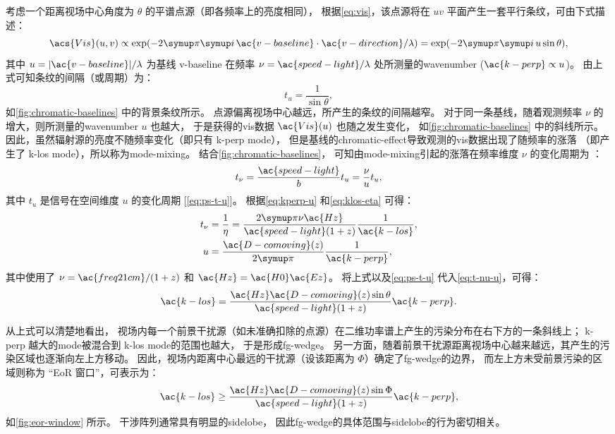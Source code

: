 考虑一个距离视场中心角度为 $\theta$ 的平谱点源（即各频率上的亮度相同），
根据\autoref{eq:vis}，该点源将在 $uv$ 平面产生一套平行条纹，可由下式描述：
\begin{equation}
  \acs{Vis}(u,v)
    \propto \exp (-2\Cpi\Ci\, \ac{v-baseline}\cdot\ac{v-direction} / \lambda)
    = \exp (-2\Cpi\Ci\, u \sin\theta) ,
\end{equation}
其中 $u = |\ac{v-baseline}|/\lambda$ 为基线 \ac{v-baseline}
在频率 $\nu = \ac{speed-light}/\lambda$ 处所测量的\ac{wavenumber}
($\ac{k-perp} \propto u$)。
由上式可知条纹的间隔（或周期）为：
\begin{equation}
  \label{eq:ps-t-u}
  t_u = \frac{1}{\sin\theta} ,
\end{equation}
如\autoref{fig:chromatic-baselines} 中的背景条纹所示。
点源偏离视场中心越远，所产生的条纹的间隔越窄。
对于同一条基线，随着观测频率 $\nu$ 的增大，则所测量的\ac{wavenumber} $u$ 也越大，
于是获得的\ac{vis}数据 $\ac{Vis}(u)$ 也随之发生变化，
如\autoref{fig:chromatic-baselines} 中的斜线所示。
因此，虽然辐射源的亮度不随频率变化（即只有 \ac{k-perp} \ac{mode}），
但是基线的\ac{chromatic-effect}导致观测的\ac{vis}数据出现了随频率的涨落
（即产生了 \ac{k-los} \ac{mode}），所以称为\ac{mode-mixing}。
结合\autoref{fig:chromatic-baselines}，
可知由\ac{mode-mixing}引起的涨落在频率维度 $\nu$ 的变化周期为 \cite{morales2012}：
\begin{equation}
  \label{eq:t-nu-u}
  t_{\nu} = \frac{\ac{speed-light}}{b} t_u
    = \frac{\nu}{u} t_u ,
\end{equation}
其中 $t_u$ 是信号在空间维度 $u$ 的变化周期 [\autoref{eq:ps-t-u}]。
根据\autoref{eq:kperp-u} 和\autoref{eq:klos-eta} 可得：
\begin{align}
  t_{\nu} & = \frac{1}{\eta}
    = \frac{2\Cpi \nu \ac{Hz}}{\ac{speed-light} (1+z)}
      \frac{1}{\ac{k-los}} , \\
  u & = \frac{\ac{D-comoving}(z)}{2\Cpi} \frac{1}{\ac{k-perp}} ,
\end{align}
其中使用了 $\nu = \ac{freq21cm} / (1+z)$ 和 $\ac{Hz} = \ac{H0} \ac{Ez}$。
将上式以及\autoref{eq:ps-t-u} 代入\autoref{eq:t-nu-u}，可得：
\begin{equation}
  \label{eq:klos-kperp}
  \ac{k-los} = \frac{\ac{Hz} \ac{D-comoving}(z) \sin\theta}{
    \ac{speed-light} (1+z)} \ac{k-perp} .
\end{equation}

从上式可以清楚地看出，
视场内每一个前景干扰源（如未准确扣除的点源）在二维功率谱上产生的污染分布在右下方的一条斜线上；
\ac{k-perp} 越大的\ac{mode}被混合到 \ac{k-los} \ac{mode}的范围也越大，
于是形成\ac{fg-wedge}。
另一方面，随着前景干扰源距离视场中心越来越远，其产生的污染区域也逐渐向左上方移动。
因此，视场内距离中心最远的干扰源（设该距离为 $\Phi$）确定了\ac{fg-wedge}的边界，
而左上方未受前景污染的区域则称为 \enquote{EoR 窗口}，可表示为：
\begin{equation}
  \ac{k-los} \ge \frac{\ac{Hz} \ac{D-comoving}(z) \sin\Phi}{
    \ac{speed-light} (1+z)} \ac{k-perp} ,
\end{equation}
如\autoref{fig:eor-window} 所示。
干涉阵列通常具有明显的\ac{sidelobe}，
因此\ac{fg-wedge}的具体范围与\ac{sidelobe}的行为密切相关。

